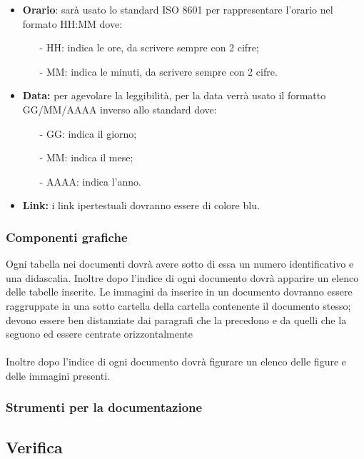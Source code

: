 \documentclass[a4paper,11pt]{article}
\begin{document}
			\begin{itemize}
				\item \textbf{Orario}: sarà usato lo standard ISO 8601 per rappresentare l'orario nel formato HH:MM dove:
					\begin{itemize}
					\item[-]HH: indica le ore, da scrivere sempre con 2 cifre;
					\item[-]MM: indica le minuti, da scrivere sempre con 2 cifre.
					\end{itemize}
				\item \textbf{Data:}  per agevolare la leggibilità, per la data verrà usato il formatto GG/MM/AAAA inverso allo standard dove:
				\begin{itemize}
				\item[-]GG: indica il giorno;
				\item[-]MM: indica il mese;
				\item[-]AAAA: indica l'anno.
				\end{itemize}
				\item \textbf{Link:} i link ipertestuali dovranno essere di colore blu.
			\end{itemize}
			\subsubsection{Componenti grafiche}
				Ogni tabella nei documenti dovrà avere sotto di essa un numero identificativo e una didascalia. Inoltre dopo l'indice di ogni documento dovrà apparire un elenco delle tabelle inserite.
					Le immagini da inserire in un documento dovranno essere raggruppate in una sotto cartella della cartella contenente il documento stesso; devono essere ben distanziate dai paragrafi che la precedono e da quelli che la seguono ed essere centrate orizzontalmente \\ \\ 
					 Inoltre dopo l'indice di ogni documento dovrà figurare un elenco delle figure e delle immagini presenti.
					 
			\subsubsection{Strumenti per la documentazione}
				
			\subsection{Verifica}
\end{document}
